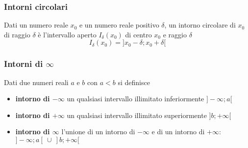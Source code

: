 \documentclass{book}     %
\begin{document}
\subsubsection{Intorni circolari}
    \begin{boxdef}
        Dati un numero reale $x_0$ e un numero reale positivo $\delta$, un intorno circolare di $x_0$ di raggio $\delta$ è l'intervallo aperto $I_\delta (x_0)$ di centro $x_0$ e raggio $\delta$ \[I_\delta(x_0)=]x_0-\delta;x_0+\delta[\]
    \end{boxdef}
\subsubsection{Intorni di $\infty$}
\begin{boxdef}
    Dati due numeri reali $a$ e $b$ con $a<b$ si definisce 
    \begin{itemize}
        \item \textbf{intorno di $-\infty$} un qualsiasi intervallo illimitato inferiormente $]-\infty;a[$
        \item \textbf{intorno di $+\infty$} un qualsiasi intervallo illimitato superiormente $]b;+\infty[$
        \item \textbf{intorno di $\infty$} l'unione di un intorno di $-\infty$ e di un intorno di $+\infty$: $]-\infty;a[\  \cup\  ]b;+\infty[$
    \end{itemize}
\end{boxdef}
\end{document}
